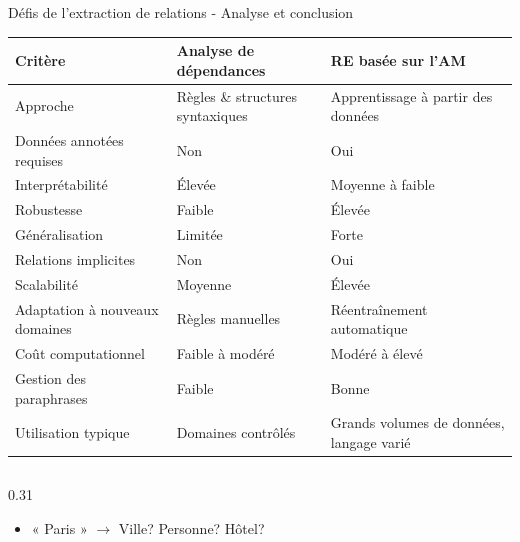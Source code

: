 \documentclass[10pt]{beamer}
\begin{document}
\begin{frame}{Défis de l'extraction de relations - Analyse et conclusion}
            \vspace{-0.1cm}

    \begin{table}\scriptsize
        \centering
        \begin{tabular}{|p{3cm}|p{3cm}|p{4cm}|}
            \hline
            \textbf{Critère} & \textbf{Analyse de dépendances} & \textbf{RE basée sur l'AM} \\
            \hline
            Approche & Règles \& structures syntaxiques & Apprentissage à partir des données \\
            \hline
            Données annotées requises & Non & Oui \\
            \hline
            Interprétabilité & Élevée & Moyenne à faible \\
            \hline
            Robustesse & Faible & Élevée \\
            \hline
            Généralisation & Limitée & Forte \\
            \hline
            Relations implicites & Non & Oui \\
            \hline
            Scalabilité & Moyenne & Élevée \\
            \hline
            Adaptation à nouveaux domaines & Règles manuelles & Réentraînement automatique \\
            \hline
            Coût computationnel & Faible à modéré & Modéré à élevé \\
            \hline
            Gestion des paraphrases & Faible & Bonne \\
            \hline
            Utilisation typique & Domaines contrôlés & Grands volumes de données, langage varié \\
            \hline
        \end{tabular}
    \end{table}
    
        \vspace{-0.1cm}
    \begin{columns}[T]
        \begin{column}{0.31\textwidth}
            \begin{tcolorbox}[colback=lightred!20, colframe=redforsnnu, title=Ambiguïté contextuelle]
                \begin{itemize}\scriptsize
                    \item « Paris » $\rightarrow$ Ville? Personne? Hôtel?
                \end{itemize}
            \end{tcolorbox}
        \end{column}
        

\end{columns}
\end{frame}
\end{document}
